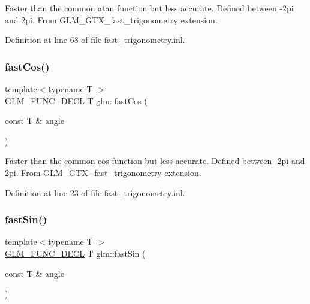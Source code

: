 Faster than the common atan function but less accurate. Defined between -\/2pi and 2pi. From G\+L\+M\+\_\+\+G\+T\+X\+\_\+fast\+\_\+trigonometry extension. 

Definition at line 68 of file fast\+\_\+trigonometry.\+inl.

\mbox{\label{group__gtx__fast__trigonometry_gad54184beaba79e41db71a1f5711380c4}} 
\subsubsection{\texorpdfstring{fast\+Cos()}{fastCos()}}
{\footnotesize\ttfamily template$<$typename T $>$ \\
\hyperlink{setup_8hpp_ab2d052de21a70539923e9bcbf6e83a51}{G\+L\+M\+\_\+\+F\+U\+N\+C\+\_\+\+D\+E\+CL} T glm\+::fast\+Cos (\begin{DoxyParamCaption}\item[{const T \&}]{angle }\end{DoxyParamCaption})}

Faster than the common cos function but less accurate. Defined between -\/2pi and 2pi. From G\+L\+M\+\_\+\+G\+T\+X\+\_\+fast\+\_\+trigonometry extension. 

Definition at line 23 of file fast\+\_\+trigonometry.\+inl.

\mbox{\label{group__gtx__fast__trigonometry_ga01b7dc431bf5f5e6acce7d6bba311f86}} 
\subsubsection{\texorpdfstring{fast\+Sin()}{fastSin()}}
{\footnotesize\ttfamily template$<$typename T $>$ \\
\hyperlink{setup_8hpp_ab2d052de21a70539923e9bcbf6e83a51}{G\+L\+M\+\_\+\+F\+U\+N\+C\+\_\+\+D\+E\+CL} T glm\+::fast\+Sin (\begin{DoxyParamCaption}\item[{const T \&}]{angle }\end{DoxyParamCaption})}

